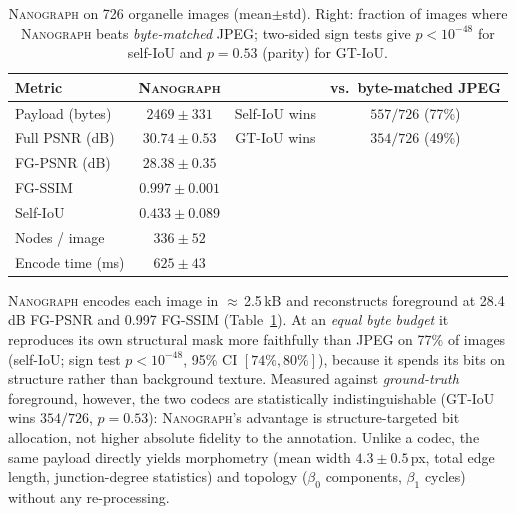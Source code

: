 \documentclass[runningheads]{llncs}
\newcommand{\method}{\textsc{Nanograph}\xspace}
\begin{document}
\begin{table}[t]
\centering
\caption{\method on 726 organelle images (mean$\pm$std). Right: fraction of
images where \method beats \emph{byte-matched} JPEG; two-sided sign tests give
$p<10^{-48}$ for self-IoU and $p=0.53$ (parity) for GT-IoU.}
\label{tab:nmi}
\setlength{\tabcolsep}{5pt}
\begin{tabular}{lccc}
\toprule
Metric & \method & & vs.\ byte-matched JPEG \\
\midrule
Payload (bytes)      & $2469\pm331$   & Self-IoU wins    & $557/726$ (77\%)\\
Full PSNR (dB)       & $30.74\pm0.53$ & GT-IoU wins      & $354/726$ (49\%)\\
FG-PSNR (dB)         & $28.38\pm0.35$ & \multicolumn{2}{l}{}\\
FG-SSIM              & $0.997\pm0.001$& \multicolumn{2}{l}{}\\
Self-IoU             & $0.433\pm0.089$& \multicolumn{2}{l}{}\\
Nodes / image        & $336\pm52$     & \multicolumn{2}{l}{}\\
Encode time (ms)     & $625\pm43$     & \multicolumn{2}{l}{}\\
\bottomrule
\end{tabular}
\end{table}

\method encodes each image in $\approx$\,2.5\,kB and reconstructs foreground at
28.4\,dB FG-PSNR and 0.997 FG-SSIM (Table~\ref{tab:nmi}). At an \emph{equal byte
budget} it reproduces its own structural mask more faithfully than JPEG on 77\%
of images (self-IoU; sign test $p<10^{-48}$, 95\% CI $[74\%,80\%]$), because it
spends its bits on structure rather than background texture. Measured against
\emph{ground-truth} foreground, however, the two codecs are statistically
indistinguishable (GT-IoU wins $354/726$, $p=0.53$): \method's advantage is
structure-targeted bit allocation, not higher absolute fidelity to the
annotation. Unlike a codec, the same payload directly yields
morphometry (mean width $4.3\pm0.5$\,px, total edge length, junction-degree
statistics) and topology ($\beta_0$ components, $\beta_1$ cycles) without any
re-processing.

\end{document}
